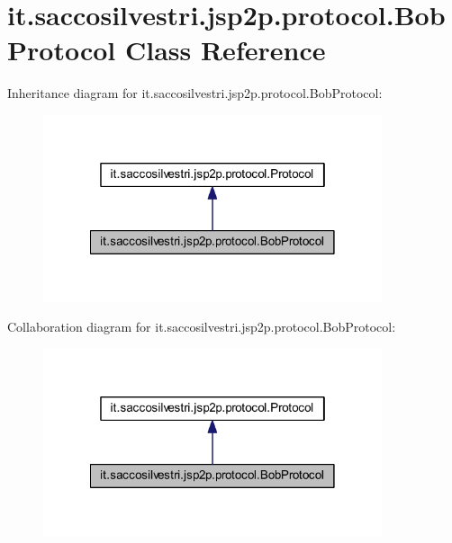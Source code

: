 \hypertarget{classit_1_1saccosilvestri_1_1jsp2p_1_1protocol_1_1_bob_protocol}{
\section{it.saccosilvestri.jsp2p.protocol.\-Bob\-Protocol \-Class \-Reference}
\label{classit_1_1saccosilvestri_1_1jsp2p_1_1protocol_1_1_bob_protocol}
}


\-Inheritance diagram for it.saccosilvestri.jsp2p.protocol.\-Bob\-Protocol\-:
\nopagebreak
\begin{figure}[H]
\begin{center}
\leavevmode
\includegraphics[width=282pt]{classit_1_1saccosilvestri_1_1jsp2p_1_1protocol_1_1_bob_protocol__inherit__graph}
\end{center}
\end{figure}


\-Collaboration diagram for it.saccosilvestri.jsp2p.protocol.\-Bob\-Protocol\-:
\nopagebreak
\begin{figure}[H]
\begin{center}
\leavevmode
\includegraphics[width=282pt]{classit_1_1saccosilvestri_1_1jsp2p_1_1protocol_1_1_bob_protocol__coll__graph}
\end{center}
\end{figure}
